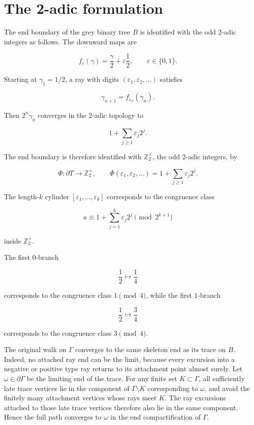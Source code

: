 \documentclass[11pt,a4paper]{scrartcl}
\begin{document}
\section{The 2-adic formulation}\label{sec:the-2-adic-formulation}


The end boundary of the grey binary tree \(B\) is identified with the odd
2-adic integers as follows. The downward maps are

\[
f_\varepsilon(\gamma)=\frac{\gamma}{2}+\varepsilon\frac12,
\qquad
\varepsilon\in\{0,1\}.
\]

Starting at \(\gamma_1=1/2\), a ray with digits
\((\varepsilon_1,\varepsilon_2,\ldots)\) satisfies

\[
\gamma_{n+1}=f_{\varepsilon_n}(\gamma_n).
\]

Then \(2^n\gamma_n\) converges in the 2-adic topology to

\[
1+\sum_{j\ge 1}\varepsilon_j2^j.
\]

The end boundary is therefore identified with
\(\mathbb Z_2^\times\), the odd 2-adic integers, by

\[
\Phi:\partial T\to\mathbb Z_2^\times,
\qquad
\Phi(\varepsilon_1,\varepsilon_2,\ldots)
=
1+\sum_{j\ge 1}\varepsilon_j2^j .
\]

The length-\(k\) cylinder \([\varepsilon_1,\ldots,\varepsilon_k]\) corresponds
to the congruence class

\[
a\equiv
1+\sum_{j=1}^k\varepsilon_j2^j
\pmod{2^{k+1}}
\]

inside \(\mathbb Z_2^\times\).

The first \(0\)-branch

\[
\frac12\longmapsto \frac14
\]

corresponds to the congruence class \(1\pmod 4\), while the first \(1\)-branch

\[
\frac12\longmapsto \frac34
\]

corresponds to the congruence class \(3\pmod 4\).

The original walk on \(\Gamma\) converges to the same skeleton end as its
trace on \(B\). Indeed, no attached ray end can be the limit, because every
excursion into a negative or positive type ray returns to its attachment point
almost surely. Let \(\omega\in\partial\overline\Gamma\) be the limiting end of
the trace. For any finite set \(K\subset\Gamma\), all sufficiently late trace
vertices lie in the component of \(\Gamma\setminus K\) corresponding to
\(\omega\), and avoid the finitely many attachment vertices whose rays meet
\(K\). The ray excursions attached to those late trace vertices therefore also
lie in the same component. Hence the full path converges to \(\omega\) in the
end compactification of \(\Gamma\).
\end{document}
